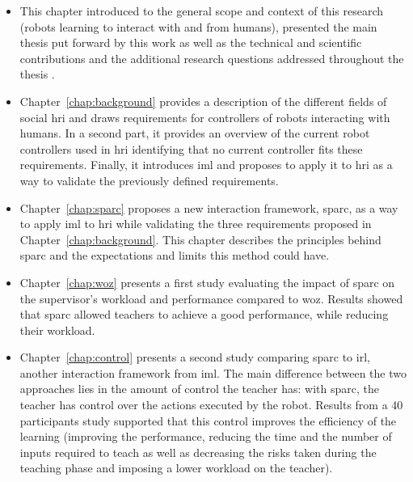 \begin{itemize}
	\item This chapter introduced to the general scope and context of this research (robots learning to interact with and from humans), presented the main thesis put forward by this work as well as the technical and scientific contributions and the additional research questions addressed throughout the thesis .

	\item Chapter~\ref{chap:background} provides a description of the different fields of social \gls{hri} and draws requirements for controllers of robots interacting with humans. In a second part, it provides an overview of the current robot controllers used in \gls{hri} identifying that no current controller fits these requirements. Finally, it introduces \gls{iml} and proposes to apply it to \gls{hri} as a way to validate the previously defined requirements.
	
	\item Chapter~\ref{chap:sparc} proposes a new interaction framework, \gls{sparc}, as a way to apply \gls{iml} to \gls{hri} while validating the three requirements proposed in Chapter~\ref{chap:background}. This chapter describes the principles behind \gls{sparc} and the expectations and limits this method could have.
	
	\item Chapter~\ref{chap:woz} presents a first study evaluating the impact of \gls{sparc} on the supervisor's workload and performance compared to \gls{woz}. Results showed that \gls{sparc} allowed teachers to achieve a good performance, while reducing their workload.
	
	\item Chapter~\ref{chap:control} presents a second study comparing \gls{sparc} to \gls{irl}, another interaction framework from \gls{iml}. The main difference between the two approaches lies in the amount of control the teacher has: with \gls{sparc}, the teacher has control over the actions executed by the robot. Results from a 40 participants study supported that this control improves the efficiency of the learning (improving the performance, reducing the time and the number of inputs required to teach as well as decreasing the risks taken during the teaching phase and imposing a lower workload on the teacher).
	

\end{itemize}
